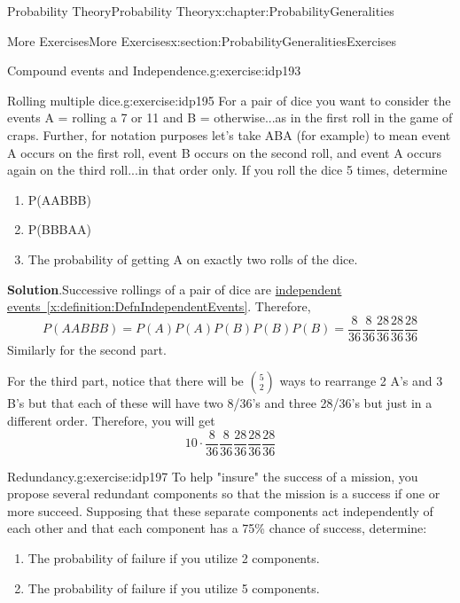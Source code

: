 \documentclass[oneside,10pt,]{book}
\newcommand{\blocktitlefont}{\relax}
\newcommand{\xreffont}{\relax}
\numberwithin{equation}{section}
\begin{document}
\begin{chapterptx}{Probability Theory}{}{Probability Theory}{}{}{x:chapter:ProbabilityGeneralities}
\begin{sectionptx}{More Exercises}{}{More Exercises}{}{}{x:section:ProbabilityGeneralitiesExercises}
\begin{inlineexercise}{Compound events and Independence.}{g:exercise:idp193}
\end{inlineexercise}%
\begin{inlineexercise}{Rolling multiple dice.}{g:exercise:idp195}%
For a pair of dice you want to consider the events A = \textbraceleft{}rolling a 7 or 11\textbraceright{} and B = \textbraceleft{}otherwise\textbraceright{}...as in the first roll in the game of craps.  Further, for notation purposes let's take ABA (for example) to mean event A occurs on the first roll, event B occurs on the second roll, and event A occurs again on the third roll...in that order only. If you roll the dice 5 times, determine%
\begin{enumerate}
\item{}P(AABBB)%
\item{}P(BBBAA)%
\item{}The probability of getting A on exactly two rolls of the dice.%
\end{enumerate}
%
\par\smallskip%
\noindent\textbf{\blocktitlefont Solution}.\hypertarget{g:solution:idp196}{}\quad{}Successive rollings of a pair of dice are \hyperref[x:definition:DefnIndependentEvents]{independent events~{\xreffont\ref{x:definition:DefnIndependentEvents}}}. Therefore,%
\begin{equation*}
P(AABBB) = P(A)P(A)P(B)P(B)P(B) = \frac{8}{36} \frac{8}{36} \frac{28}{36} \frac{28}{36} \frac{28}{36}
\end{equation*}
Similarly for the second part.%
\par
For the third part, notice that there will be \(\binom{5}{2}\) ways to rearrange 2 A's and 3 B's but that each of these will have two 8\slash{}36's and three 28\slash{}36's but just in a different order. Therefore, you will get%
\begin{equation*}
10 \cdot \frac{8}{36} \frac{8}{36} \frac{28}{36} \frac{28}{36} \frac{28}{36}
\end{equation*}
%
\end{inlineexercise}%
\begin{inlineexercise}{Redundancy.}{g:exercise:idp197}%
To help "insure" the success of a mission, you propose several redundant components so that the mission is a success if one or more succeed. Supposing that these separate components act independently of each other and that each component has a 75\% chance of success, determine:%
\begin{enumerate}
\item{}The probability of failure if you utilize 2 components.%
\item{}The probability of failure if you utilize 5 components.%

\end{enumerate}
\end{inlineexercise}
\end{sectionptx}
\end{chapterptx}
\end{document}
